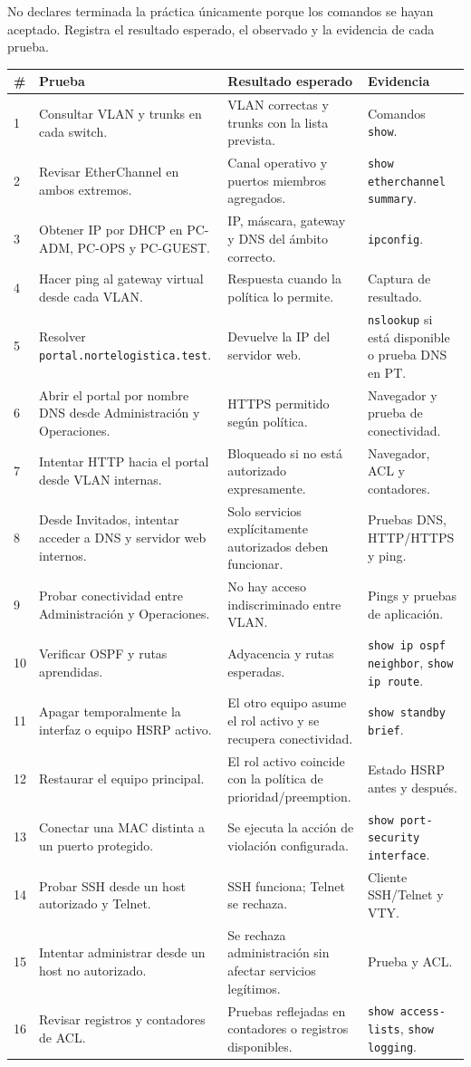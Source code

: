 \documentclass[12pt,a4paper]{article}
\begin{document}
No declares terminada la práctica únicamente porque los comandos se hayan aceptado. Registra el resultado esperado, el observado y la evidencia de cada prueba.
\begin{longtable}{p{0.6cm}p{5.1cm}p{4.2cm}p{3.0cm}}
\toprule
\textbf{\#} & \textbf{Prueba} & \textbf{Resultado esperado} & \textbf{Evidencia} \\
\midrule
1 & Consultar VLAN y trunks en cada switch. & VLAN correctas y trunks con la lista prevista. & Comandos \texttt{show}. \\
2 & Revisar EtherChannel en ambos extremos. & Canal operativo y puertos miembros agregados. & \texttt{show etherchannel summary}. \\
3 & Obtener IP por DHCP en PC-ADM, PC-OPS y PC-GUEST. & IP, máscara, gateway y DNS del ámbito correcto. & \texttt{ipconfig}. \\
4 & Hacer ping al gateway virtual desde cada VLAN. & Respuesta cuando la política lo permite. & Captura de resultado. \\
5 & Resolver \texttt{portal.nortelogistica.test}. & Devuelve la IP del servidor web. & \texttt{nslookup} si está disponible o prueba DNS en PT. \\
6 & Abrir el portal por nombre DNS desde Administración y Operaciones. & HTTPS permitido según política. & Navegador y prueba de conectividad. \\
7 & Intentar HTTP hacia el portal desde VLAN internas. & Bloqueado si no está autorizado expresamente. & Navegador, ACL y contadores. \\
8 & Desde Invitados, intentar acceder a DNS y servidor web internos. & Solo servicios explícitamente autorizados deben funcionar. & Pruebas DNS, HTTP/HTTPS y ping. \\
9 & Probar conectividad entre Administración y Operaciones. & No hay acceso indiscriminado entre VLAN. & Pings y pruebas de aplicación. \\
10 & Verificar OSPF y rutas aprendidas. & Adyacencia y rutas esperadas. & \texttt{show ip ospf neighbor}, \texttt{show ip route}. \\
11 & Apagar temporalmente la interfaz o equipo HSRP activo. & El otro equipo asume el rol activo y se recupera conectividad. & \texttt{show standby brief}. \\
12 & Restaurar el equipo principal. & El rol activo coincide con la política de prioridad/preemption. & Estado HSRP antes y después. \\
13 & Conectar una MAC distinta a un puerto protegido. & Se ejecuta la acción de violación configurada. & \texttt{show port-security interface}. \\
14 & Probar SSH desde un host autorizado y Telnet. & SSH funciona; Telnet se rechaza. & Cliente SSH/Telnet y VTY. \\
15 & Intentar administrar desde un host no autorizado. & Se rechaza administración sin afectar servicios legítimos. & Prueba y ACL. \\
16 & Revisar registros y contadores de ACL. & Pruebas reflejadas en contadores o registros disponibles. & \texttt{show access-lists}, \texttt{show logging}. \\
\bottomrule
\end{longtable}
\end{document}
